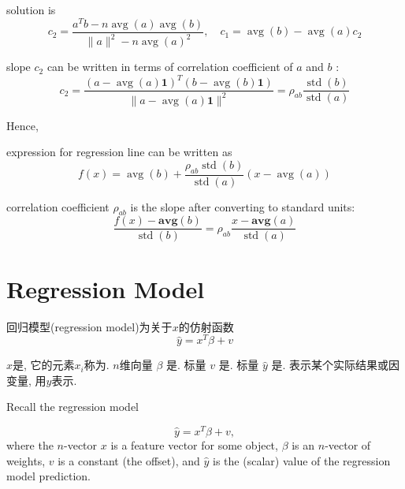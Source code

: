 \begin{theorem}
    solution is
$$
c_{2}=\frac{a^{T} b-n \operatorname{avg}(a) \operatorname{avg}(b)}{\|a\|^{2}-n \operatorname{avg}(a)^{2}}, \quad c_{1}=\operatorname{avg}(b)-\operatorname{avg}(a) c_{2}
$$
\end{theorem}

\begin{corollary}
    slope $ c_{2} $ can be written in terms of correlation coefficient of $ a $ and $ b $ :
$$
c_{2}=\frac{(a-\operatorname{avg}(a) \mathbf{1})^{T}(b-\operatorname{a v g}(b) \mathbf{1})}{\|a-\operatorname{a v g}(a) \mathbf{1}\|^{2}}=\rho_{a b} \frac{\operatorname{std}(b)}{\operatorname{std}(a)}
$$
\end{corollary}

Hence, 

\begin{corollary}
    expression for regression line can be written as
$$
f(x)=\operatorname{avg}(b)+\frac{\rho_{a b} \operatorname{std}(b)}{\operatorname{std}(a)}(x-\operatorname{avg}(a))
$$
\end{corollary}

\begin{corollary}
    correlation coefficient $ \rho_{a b} $ is the slope after converting to standard units:
$$
\frac{f(x)-\mathbf{a v g}(b)}{\operatorname{std}(b)}=\rho_{a b} \frac{x-\mathbf{a v g}(a)}{\operatorname{std}(a)}
$$
\end{corollary}



\section{Regression Model}


\begin{definition}
    回归模型(regression model)为关于$x$的仿射函数
    $$ \hat{y}=x^{T} \beta+v $$

    $x$是, 它的元素$x_i$称为. $n$维向量 $ \beta $ 是. 标量 $ v $ 是. 标量 $ \hat{y} $ 是. 表示某个实际结果或因变量, 用$y$表示. 
\end{definition}

Recall the regression model

\begin{problem}
    $$
    \hat{y}=x^{T} \beta+v,
    $$
    where the $ n $-vector $ x $ is a feature vector for some object, $ \beta $ is an $ n $-vector of weights, $ v $ is a constant (the offset), and $ \hat{y} $ is the (scalar) value of the regression model prediction.
\end{problem}

